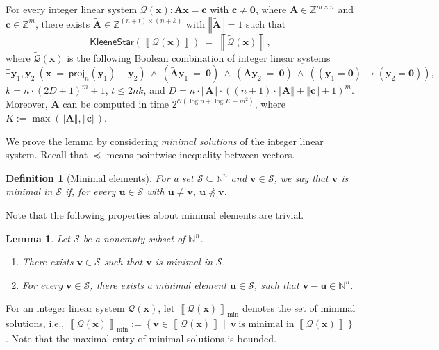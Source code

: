 \documentclass[10pt,a4paper]{article}
\newtheorem{lemma}[theorem]{Lemma}
\newtheorem{definition}[theorem]{Definition}
\theoremstyle{definition}
\theoremstyle{remark}
\newcommand{\cO}{\mathcal{O}}
\newcommand{\cQ}{\mathcal{Q}}
\newcommand{\cQtilde}{\tilde{\mathcal{Q}}}
\newcommand{\cS}{\mathcal{S}}
\newcommand{\bbN}{\mathbb{N}}
\newcommand{\bbZ}{\mathbb{Z}}
\newcommand{\bfA}{\mathbf{A}}
\newcommand{\bfAtilde}{\tilde{\mathbf{A}}}
\newcommand{\bfc}{\mathbf{c}}
\newcommand{\bfu}{\mathbf{u}}
\newcommand{\bfv}{\mathbf{v}}
\newcommand{\bfx}{\mathbf{x}}
\newcommand{\bfy}{\mathbf{y}}
\newcommand{\bfzero}{\mathbf{0}}
\newcommand{\setc}[2]        {\left\{ #1 \middle|\  #2 \right\}}
\newcommand{\norm}[1]        {\left\Vert #1 \right\Vert}
\newcommand{\projp}[2]     {\mathsf{proj}_{ #1 }\left( #2 \right)}
\newcommand{\kstar}[1] {\mathsf{KleeneStar}\left( #1 \right)}
\newcommand{\sol}[1] {\left\llbracket #1 \right\rrbracket}
\newcommand{\solmin}[1] {\left\llbracket #1 \right\rrbracket_\text{min}}
\newcommand{\vle} {\preccurlyeq}
\newcommand{\bigO}[1] {{\cO\left( #1 \right)}}
\begin{document}
\medskip

For every integer linear system $\cQ(\bfx): \bfA \bfx = \bfc$ with $\bfc \neq \bfzero$,
where $\bfA \in \bbZ^{m \times n}$ and $\bfc \in \bbZ^{m}$,
there exists $\bfAtilde \in \bbZ^{(n+t) \times (n+k)}$ with $\norm{\bfAtilde} = 1$
such that
\begin{equation*}
    \kstar{\sol{\cQ(\bfx)}}\ =\ \sol{\cQtilde(\bfx)},
\end{equation*}
where $\cQtilde(\bfx)$ is the following Boolean combination of integer linear systems
\begin{equation*}    
    \exists \bfy_1, \bfy_2\ 
    (\bfx\ =\ \projp{n}{\bfy_1} + \bfy_2)\ \land\ 
    (\bfAtilde\bfy_1\ =\ \bfzero)\ \land\ 
    (\bfA\bfy_2\ =\ \bfzero)\ \land\ 
    ((\bfy_1=\bfzero) \to (\bfy_2=\bfzero)),
\end{equation*}
$k = n\cdot(2D+1)^{m} + 1$,
$t \le 2nk$, and
$D = n \cdot \norm{\bfA} \cdot \left((n+1)\cdot \norm{\bfA} + \norm{\bfc} + 1\right)^{m}$.
Moreover, $\bfAtilde$ can be computed in time $2^\bigO{\log n + \log K + m^2}$,
where $K := \max\left(\norm{\bfA}, \norm{\bfc}\right)$.

\medskip

We prove the lemma by considering \emph{minimal solutions} of the integer linear system.
Recall that $\vle$ means pointwise inequality between vectors.
\begin{definition}[Minimal elements]
    For a set $\cS \subseteq \bbN^n$ and $\bfv \in \cS$,
    we say that $\bfv$ is \emph{minimal} in $\cS$
    if, for every $\bfu \in \cS$ with $\bfu \neq \bfv$,
     $\bfu \not\vle \bfv$.
\end{definition}

Note that the following properties about minimal elements are trivial.
\begin{lemma}\label{lem:min_property}
    Let $\cS$ be a nonempty subset of $\bbN^n$.
    \begin{enumerate}
        \item There exists $\bfv \in \cS$ such that $\bfv$ is minimal in $\cS$.
        \item For every $\bfv \in \cS$, there exists a minimal element $\bfu \in \cS$,
            such that $\bfv - \bfu \in \bbN^n$.
    \end{enumerate}
\end{lemma}

For an integer linear system $\cQ(\bfx)$,
let $\solmin{\cQ(\bfx)}$ denotes the set of minimal solutions,
i.e., $\solmin{\cQ(\bfx)} := \setc{\bfv \in \sol{\cQ(\bfx)}}{\bfv\ \text{is minimal in}\ \sol{\cQ(\bfx)}}$.
Note that the maximal entry of minimal solutions is bounded.
\end{document}
